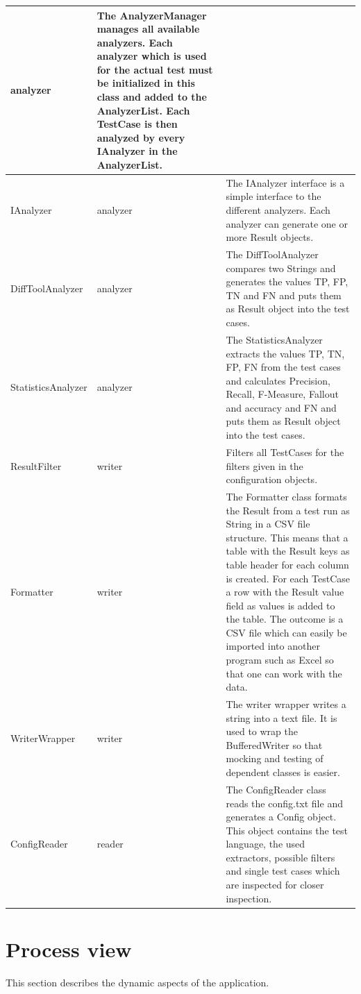 \begin{longtable}{p{4cm}|p{2cm}|p{8cm}}
analyzer &          
The AnalyzerManager manages all available analyzers. Each analyzer which is used for the actual test must be initialized in this class and added to the AnalyzerList. Each TestCase is then analyzed by every IAnalyzer in the AnalyzerList.
\\ \hline
IAnalyzer &
analyzer &
The IAnalyzer interface is a simple interface to the different analyzers. Each analyzer can generate one or more Result objects.
\\ \hline
DiffToolAnalyzer &
analyzer &
The DiffToolAnalyzer compares two Strings and generates the values TP, FP, TN and FN and puts them as Result object into the test cases.
\\ \hline
StatisticsAnalyzer &
analyzer &
The StatisticsAnalyzer extracts the values TP, TN, FP, FN from the test cases and calculates Precision, Recall, F-Measure, Fallout and accuracy and FN and puts them as Result object into the test cases.
\\ \hline
ResultFilter &
writer &
Filters all TestCases for the filters given in the configuration objects.
\\ \hline
Formatter &           
writer &           
The Formatter class formats the Result from a test run as String in a CSV file structure. This means that a table with the Result keys as table header for each column is created. For each TestCase a row with the Result value field as values is added to the table. The outcome is a CSV file which can easily be imported into another program such as Excel so that one can work with the data.
\\ \hline
WriterWrapper &
writer &
The writer wrapper writes a string into a text file. It is used to wrap the BufferedWriter so that mocking and testing of dependent classes is easier.
\\ \hline
ConfigReader &
reader &
The ConfigReader class reads the config.txt file and generates a Config object. This object contains the test language, the used extractors, possible filters and single test cases which are inspected for closer inspection.
\\ \hline
\end{longtable}


\section{Process view}

This section describes the dynamic aspects of the application.

